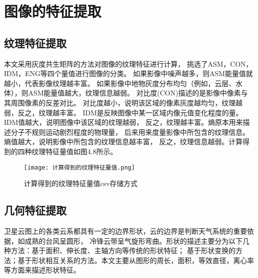 \section{图像的特征提取}

\subsection{纹理特征提取}
本文采用灰度共生矩阵的方法对图像的纹理特征进行计算，
挑选了ASM，CON，IDM，ENG等四个量值进行图像的分类。
如果影像中噪声越多，则ASM能量值就越小，代表影像纹理越丰富。
如果影像中地物灰度分布均匀（例如，云层、水体），则ASM能量值越大，纹理信息越弱。
对比度(CON)描述的是影像中像素与其周围像素的反差对比。
对比度越小，说明该区域的像素灰度越均匀，纹理越弱，反之，纹理越丰富。
IDM是反映图像中某一区域内像元值变化程度的量。IDM值越大，说明图像中该区域的纹理越弱，
反之，纹理越丰富。熵原本用来描述分子不规则运动剧烈程度的物理量，
后来用来度量影像中所包含的纹理信息。熵值越大，说明影像中所包含的纹理信息越丰富，
反之，纹理信息越弱。计算得到的四种纹理特征量值如图4.8所示。

\begin{figure}[htb]
    \centering
    \texttt{[image: 计算得到的纹理特征量值.png]}
    \caption{计算得到的纹理特征量值csv存储方式}
\end{figure}

\iffalse
\begin{algorithm}[htb]
    \small
    \SetAlgoLined
    \KwData{this text}
    \KwResult{how to write algorithm}
  
    initialization\;
    \While{not at end of this document}{
      read current\;
      \eIf{understand}{
        go to next section\;
        current section becomes this one\;
      }{
        go back to the beginning of current section\;
      }
    }
    \caption{纹理特征计算算法}
    \label{algo:algorithm1}
\end{algorithm}
\fi

\newpage
\subsection{几何特征提取}
卫星云图上的各类云系都具有一定的边界形状，云的边界是判断天气系统的重要依据，如成熟的台风呈圆形，
冷锋云带呈气旋形弯曲。形状的描述主要分为以下几种方法：基于面积、伸长度、主轴方向等传统的形状特征；
基于形状变换的方法；基于形状相互关系的方法。本文主要从图形的周长，面积，等效直径，离心率等方面来描述形状特征。

